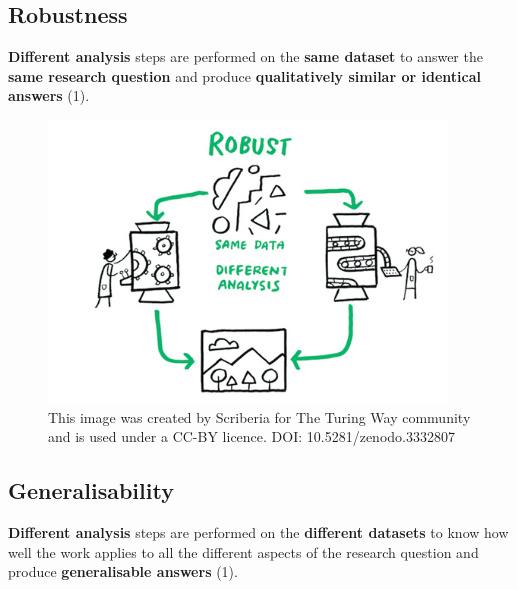 \documentclass[
  letterpaper,
  DIV=11,
  numbers=noendperiod,
  oneside]{scrreprt}
\begin{document}
\subsection{Robustness}

\textbf{Different analysis} steps are performed on the \textbf{same
dataset} to answer the \textbf{same research question} and produce
\textbf{qualitatively similar or identical answers} (1).

\begin{figure}

{\centering \includegraphics[width=4.16667in,height=\textheight]{images/paste-1E28AEDC.png}

}

\caption{\label{fig-robustness}This image was created by Scriberia for
The Turing Way community and is used under a CC-BY licence. DOI:
10.5281/zenodo.3332807}

\end{figure}

\subsection{Generalisability}

\textbf{Different analysis} steps are performed on the \textbf{different
datasets} to know how well the work applies to all the different aspects
of the research question and produce \textbf{generalisable answers} (1).
\end{document}
